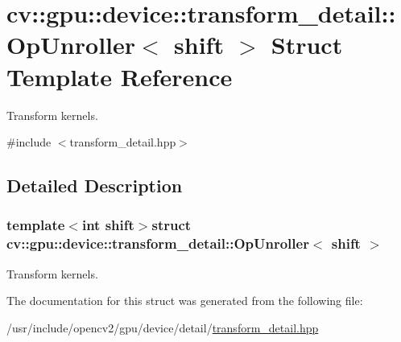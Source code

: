 \hypertarget{structcv_1_1gpu_1_1device_1_1transform__detail_1_1OpUnroller}{\section{cv\-:\-:gpu\-:\-:device\-:\-:transform\-\_\-detail\-:\-:Op\-Unroller$<$ shift $>$ Struct Template Reference}
\label{structcv_1_1gpu_1_1device_1_1transform__detail_1_1OpUnroller}
}


Transform kernels.  




{\ttfamily \#include $<$transform\-\_\-detail.\-hpp$>$}



\subsection{Detailed Description}
\subsubsection*{template$<$int shift$>$struct cv\-::gpu\-::device\-::transform\-\_\-detail\-::\-Op\-Unroller$<$ shift $>$}

Transform kernels. 

The documentation for this struct was generated from the following file\-:\begin{DoxyCompactItemize}
\item 
/usr/include/opencv2/gpu/device/detail/\hyperlink{transform__detail_8hpp}{transform\-\_\-detail.\-hpp}\end{DoxyCompactItemize}
